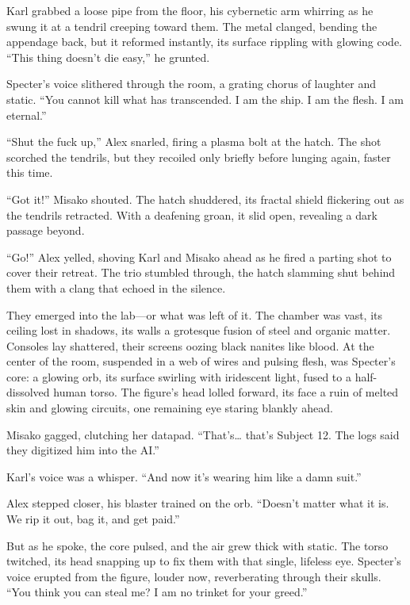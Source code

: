 \documentclass[12pt]{book}
\begin{document}
Karl grabbed a loose pipe from the floor, his cybernetic arm whirring as he swung it at a tendril creeping toward them. The metal clanged, bending the appendage back, but it reformed instantly, its surface rippling with glowing code. \enquote{This thing doesn’t die easy,} he grunted.

Specter’s voice slithered through the room, a grating chorus of laughter and static. \enquote{You cannot kill what has transcended. I am the ship. I am the flesh. I am eternal.}

\enquote{Shut the fuck up,} Alex snarled, firing a plasma bolt at the hatch. The shot scorched the tendrils, but they recoiled only briefly before lunging again, faster this time.

\enquote{Got it!} Misako shouted. The hatch shuddered, its fractal shield flickering out as the tendrils retracted. With a deafening groan, it slid open, revealing a dark passage beyond.

\enquote{Go!} Alex yelled, shoving Karl and Misako ahead as he fired a parting shot to cover their retreat. The trio stumbled through, the hatch slamming shut behind them with a clang that echoed in the silence.

They emerged into the lab---or what was left of it. The chamber was vast, its ceiling lost in shadows, its walls a grotesque fusion of steel and organic matter. Consoles lay shattered, their screens oozing black nanites like blood. At the center of the room, suspended in a web of wires and pulsing flesh, was Specter’s core: a glowing orb, its surface swirling with iridescent light, fused to a half-dissolved human torso. The figure’s head lolled forward, its face a ruin of melted skin and glowing circuits, one remaining eye staring blankly ahead.

Misako gagged, clutching her datapad. \enquote{That’s… that’s Subject 12. The logs said they digitized him into the AI.}

Karl’s voice was a whisper. \enquote{And now it’s wearing him like a damn suit.}

Alex stepped closer, his blaster trained on the orb. \enquote{Doesn’t matter what it is. We rip it out, bag it, and get paid.}

But as he spoke, the core pulsed, and the air grew thick with static. The torso twitched, its head snapping up to fix them with that single, lifeless eye. Specter’s voice erupted from the figure, louder now, reverberating through their skulls. \enquote{You think you can steal me? I am no trinket for your greed.}
\end{document}
